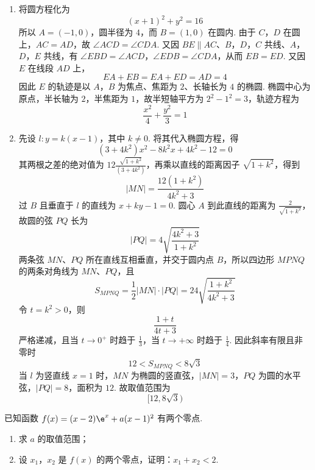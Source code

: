 \begin{solution}
\begin{enumerate}
\item 将圆方程化为
\[
(x+1)^2+y^2=16
\]
所以 \(A=(-1,0)\)，圆半径为 \(4\)，而 \(B=(1,0)\) 在圆内. 由于 \(C\)，\(D\) 在圆上，\(AC=AD\)，故 \(\angle ACD=\angle CDA\). 又因 \(BE\parallel AC\)、\(B\)，\(D\)，\(C\) 共线、\(A\)，\(D\)，\(E\) 共线，有 \(\angle EBD=\angle ACD\)，\(\angle EDB=\angle CDA\)，从而 \(EB=ED\). 又因 \(E\) 在线段 \(AD\) 上，
\[
EA+EB=EA+ED=AD=4
\]
因此 \(E\) 的轨迹是以 \(A\)，\(B\) 为焦点、焦距为 \(2\)、长轴长为 \(4\) 的椭圆. 椭圆中心为原点，半长轴为 \(2\)，半焦距为 \(1\)，故半短轴平方为 \(2^2-1^2=3\)，轨迹方程为
\[
\frac{x^2}{4}+\frac{y^2}{3}=1
\]
\item 先设 \(l:y=k(x-1)\)，其中 \(k\ne0\). 将其代入椭圆方程，得
\[
(3+4k^2)x^2-8k^2x+4k^2-12=0
\]
其两根之差的绝对值为 \(12\frac{\sqrt{1+k^2}}{(3+4k^2)}\)，再乘以直线的距离因子 \(\sqrt{1+k^2}\)，得到
\[
|MN|=\frac{12(1+k^2)}{4k^2+3}
\]
过 \(B\) 且垂直于 \(l\) 的直线为 \(x+ky-1=0\). 圆心 \(A\) 到此直线的距离为 \(\frac{2}{\sqrt{1+k^2}}\)，故圆的弦 \(PQ\) 长为
\[
|PQ|=4\sqrt{\frac{4k^2+3}{1+k^2}}
\]
两条弦 \(MN\)、\(PQ\) 所在直线互相垂直，并交于圆内点 \(B\)，所以四边形 \(MPNQ\) 的两条对角线为 \(MN\)、\(PQ\)，且
\[
S_{MPNQ}=\frac12|MN|\cdot|PQ|
=24\sqrt{\frac{1+k^2}{4k^2+3}}
\]
令 \(t=k^2>0\)，则
\[
\frac{1+t}{4t+3}
\]
严格递减，且当 \(t\to0^+\) 时趋于 \(\frac{1}{3}\)，当 \(t\to+\infty\) 时趋于 \(\frac{1}{4}\). 因此斜率有限且非零时
\[
12<S_{MPNQ}<8\sqrt3
\]
当 \(l\) 为竖直线 \(x=1\) 时，\(MN\) 为椭圆的竖直弦，\(|MN|=3\)，\(PQ\) 为圆的水平弦，\(|PQ|=8\)，面积为 \(12\). 故取值范围为
\[
[12,8\sqrt3)
\]
\end{enumerate}
\end{solution}


\begin{problem}
已知函数 \(f(x)=(x-2)\e^x+a(x-1)^2\) 有两个零点.

\begin{enumerate}
\item 求 \(a\) 的取值范围；
\item 设 \(x_1\)，\(x_2\) 是 \(f(x)\) 的两个零点，证明：\(x_1+x_2<2\).
\end{enumerate}
\end{problem}


